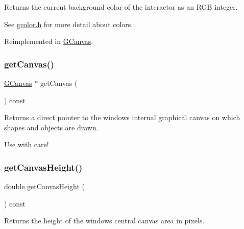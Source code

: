 Returns the current background color of the interactor as an R\+GB integer. 

See \mbox{\hyperlink{gcolor_8h_source}{gcolor.\+h}} for more detail about colors. 

Reimplemented in \mbox{\hyperlink{classGCanvas_af66f525e8154dbc8dcd2daecf3728ba9}{G\+Canvas}}.

\mbox{\label{classGWindow_a7aed3237105aa56033642252b3b1445e}} 
\subsubsection{\texorpdfstring{get\+Canvas()}{getCanvas()}}
{\footnotesize\ttfamily \mbox{\hyperlink{classGCanvas}{G\+Canvas}} $\ast$ get\+Canvas (\begin{DoxyParamCaption}{ }\end{DoxyParamCaption}) const\hspace{0.3cm}{\ttfamily [virtual]}}



Returns a direct pointer to the window\textquotesingle{}s internal graphical canvas on which shapes and objects are drawn. 

Use with care! \mbox{\label{classGWindow_abd8bb28e2ac85d1b474db3f17f65115e}} 
\subsubsection{\texorpdfstring{get\+Canvas\+Height()}{getCanvasHeight()}}
{\footnotesize\ttfamily double get\+Canvas\+Height (\begin{DoxyParamCaption}{ }\end{DoxyParamCaption}) const\hspace{0.3cm}{\ttfamily [virtual]}}



Returns the height of the window\textquotesingle{}s central canvas area in pixels. 

\mbox{\label{classGWindow_a7d095192cefa2d9acf8fcf1cd00386c4}} 
